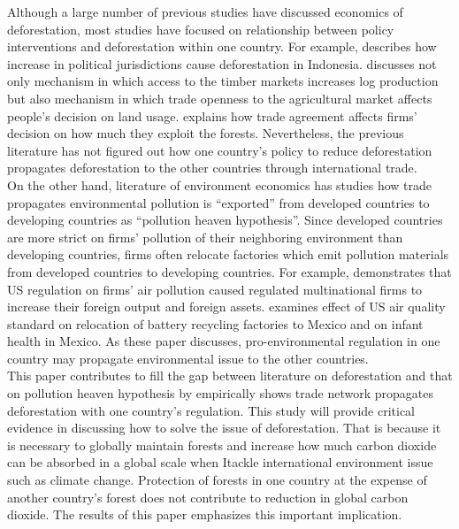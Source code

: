 \documentclass[a4paper,12pt]{article}
\begin{document}
Although a large number of previous studies have discussed economics of deforestation, most studies have focused on relationship between policy interventions and deforestation within one country. For example, \cite{burgess2012political} describes how increase in political jurisdictions cause deforestation in Indonesia. \cite{abman2020does} discusses not only mechanism in which access to the timber markets increases log production but also mechanism in which trade openness to the agricultural market affects people's decision on land usage. \cite{harstad2023contingent} explains how trade agreement affects firms' decision on how much they exploit the forests. Nevertheless, the previous literature has not figured out how one country's policy to reduce deforestation propagates deforestation to the other countries through international trade. \\

On the other hand, literature of environment economics has studies how trade propagates environmental pollution is ``exported'' from developed countries to developing countries as ``pollution heaven hypothesis''. Since developed countries are more strict on firms' pollution of their neighboring environment than developing countries, firms often relocate factories which emit pollution materials from developed countries to developing countries. For example, \cite{hanna2010us} demonstrates that US regulation on firms' air pollution caused regulated multinational firms to increase their foreign output and foreign assets. \cite{tanaka2022north} examines effect of US air quality standard on relocation of battery recycling factories to Mexico and on infant health in Mexico. As these paper discusses, pro-environmental regulation in one country may propagate environmental issue to the other countries. \\

This paper contributes to fill the gap between literature on deforestation and that on pollution heaven hypothesis by empirically shows trade network propagates deforestation with one country's regulation. This study will provide critical evidence in discussing how to solve the issue of deforestation. That is because it is necessary to globally maintain forests and increase how much carbon dioxide can be absorbed in a global scale when Itackle international environment issue such as climate change. Protection of forests in one country at the expense of another country's forest does not contribute to reduction in global carbon dioxide. The results of this paper emphasizes this important implication. \\
\end{document}
